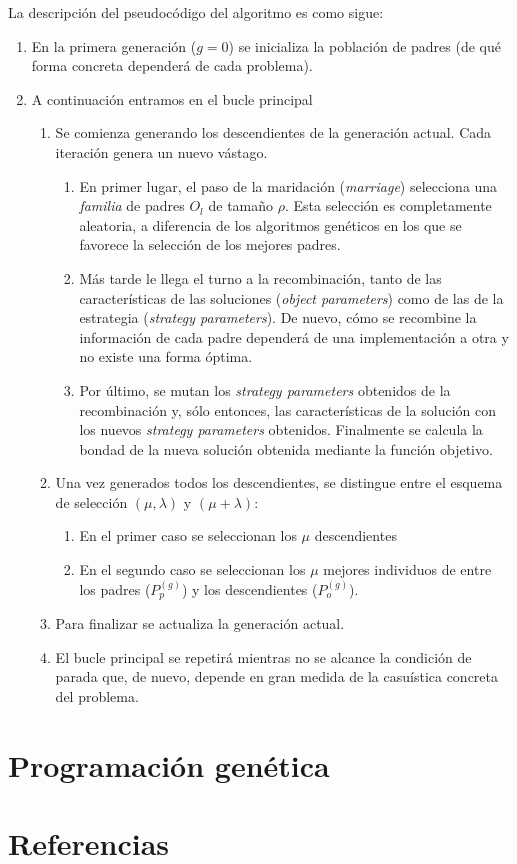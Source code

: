 \documentclass[12pt]{article} \usepackage[utf8x]{inputenc}
\begin{document}
La descripción del pseudocódigo del algoritmo es como sigue:

\begin{enumerate}
\item En la primera generación ($g = 0$) se inicializa la población de padres (de qué forma concreta dependerá de cada problema).
\item A continuación entramos en el bucle principal
  \begin{enumerate}
  \item Se comienza generando los descendientes de la generación actual. Cada iteración genera un nuevo vástago.
    \begin{enumerate}
    \item En primer lugar, el paso de la maridación (\textit{marriage}) selecciona una \textit{familia} de padres $O_l$ de tamaño $\rho$. Esta selección es completamente aleatoria, a diferencia de los algoritmos genéticos en los que se favorece la selección de los mejores padres.
    \item Más tarde le llega el turno a la recombinación, tanto de las características de las soluciones (\textit{object parameters}) como de las de la estrategia (\textit{strategy parameters}). De nuevo, cómo se recombine la información de cada padre dependerá de una implementación a otra y no existe una forma óptima.
    \item Por último, se mutan los \textit{strategy parameters} obtenidos de la recombinación y, sólo entonces, las características de la solución con los nuevos \textit{strategy parameters} obtenidos. Finalmente se calcula la bondad de la nueva solución obtenida mediante la función objetivo.
    \end{enumerate}
  \item Una vez generados todos los descendientes, se distingue entre el esquema de  selección $(\mu, \lambda)$ y $(\mu + \lambda)$:
    \begin{enumerate}
    \item En el primer caso se seleccionan los $\mu$ descendientes
    \item En el segundo caso se seleccionan los $\mu$ mejores individuos de entre los padres ($P_p^{(g)}$) y los descendientes ($P_o^{(g)}$).
    \end{enumerate}
  \item Para finalizar se actualiza la generación actual.
  \item El bucle principal se repetirá mientras no se alcance la condición de parada que, de nuevo, depende en gran medida de la casuística concreta del problema.
  \end{enumerate}
\end{enumerate}

\section{Programación genética}

\section{Referencias}
\end{document}
